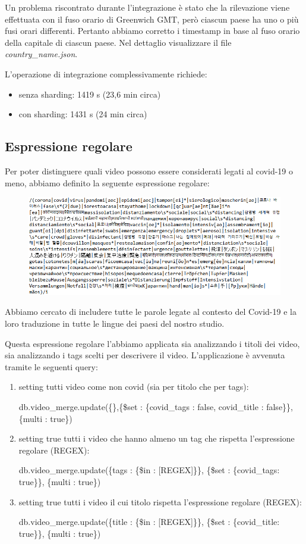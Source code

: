 \documentclass[10pt, a4paper,openany]{article}
\begin{document}
	Un problema riscontrato durante l'integrazione è stato che la rilevazione viene effettuata con il fuso orario di Greenwich GMT, però ciascun paese ha uno o più fusi orari differenti. Pertanto abbiamo corretto i timestamp in base al fuso orario della capitale di ciascun paese. Nel dettaglio visualizzare il file \textit{country\_name.json}.
	
	L'operazione di integrazione complessivamente richiede:
	\begin{itemize}
		\item senza sharding: 1419 s (23,6 min circa)
		\item con sharding: 1431 s (24 min circa)
	\end{itemize}
\subsection*{Espressione regolare}
	Per poter distinguere quali video possono essere considerati legati al covid-19 o meno, abbiamo definito la seguente espressione regolare:
	\begin{figure}[H]
		\centering
		\includegraphics[width=0.95\linewidth]{pics/er.png}
	\end{figure}

	Abbiamo cercato di includere tutte le parole legate al contesto del Covid-19 e la loro traduzione in tutte le lingue dei paesi del nostro studio.
	
	Questa espressione regolare l'abbiamo applicata sia analizzando i titoli dei video, sia analizzando i tags scelti per descrivere il video. L'applicazione è avvenuta tramite le seguenti query:
	\begin{enumerate}
		\item setting tutti video come non covid (sia per titolo che per tags):
		
			db.video\_merge.update(\{\},\{\$set : \{covid\_tags : false, covid\_title : false\}\},\{multi : true\})
		
		\item setting true tutti i video che hanno almeno un tag che rispetta l'espressione regolare (REGEX):
		
			db.video\_merge.update(\{tags : \{\$in : [REGEX]\}\}, \{\$set : \{covid\_tags: true\}\}, \{multi : true\})
		
		\item setting true tutti i video il cui titolo rispetta l'espressione regolare (REGEX):
		
			db.video\_merge.update(\{title : \{\$in : [REGEX]\}\}, \{\$set : \{covid\_title: true\}\}, \{multi : true\})
	\end{enumerate}
\end{document}
